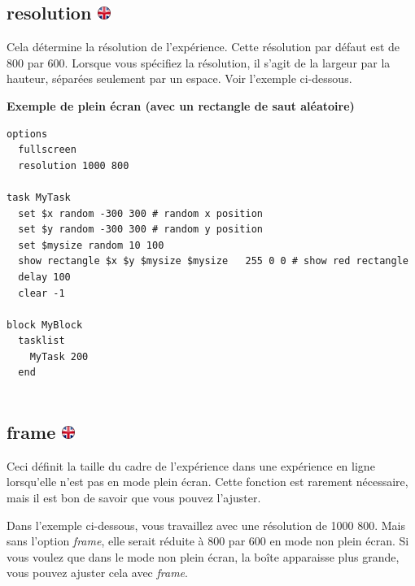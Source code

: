 \documentclass[
]{book}
\begin{document}
\hypertarget{resolution}{%
\subsection[resolution ]{\texorpdfstring{resolution \href{https://www.psytoolkit.org/doc3.4.0/syntax.html\#options-resolution}{\protect\includegraphics{img/ukflag.png}}}{resolution }}\label{resolution}}

Cela détermine la résolution de l'expérience. Cette résolution par défaut est de 800 par 600. Lorsque vous spécifiez la résolution, il s'agit de la largeur par la hauteur, séparées seulement par un espace. Voir l'exemple ci-dessous.

\textbf{Exemple de plein écran (avec un rectangle de saut aléatoire)}

\begin{verbatim}
options
  fullscreen
  resolution 1000 800

task MyTask
  set $x random -300 300 # random x position
  set $y random -300 300 # random y position
  set $mysize random 10 100
  show rectangle $x $y $mysize $mysize   255 0 0 # show red rectangle
  delay 100
  clear -1

block MyBlock
  tasklist
    MyTask 200
  end
  
\end{verbatim}

\hypertarget{frame}{%
\subsection[frame ]{\texorpdfstring{frame \href{https://www.psytoolkit.org/doc3.4.0/syntax.html\#options-frame}{\protect\includegraphics{img/ukflag.png}}}{frame }}\label{frame}}

Ceci définit la taille du cadre de l'expérience dans une expérience en ligne lorsqu'elle n'est pas en mode plein écran. Cette fonction est rarement nécessaire, mais il est bon de savoir que vous pouvez l'ajuster.

Dans l'exemple ci-dessous, vous travaillez avec une résolution de 1000 800. Mais sans l'option \emph{frame}, elle serait réduite à 800 par 600 en mode non plein écran. Si vous voulez que dans le mode non plein écran, la boîte apparaisse plus grande, vous pouvez ajuster cela avec \emph{frame}.
\end{document}
